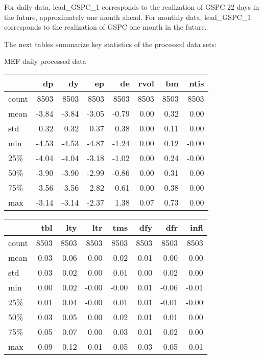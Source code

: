 \documentclass{article}
\begin{document}
For daily data, lead\_GSPC\_1 corresponds to the realization of GSPC 22 days in the future, approximately one month ahead. For monthly data, lead\_GSPC\_1 corresponds to the realization of GSPC one month in the future.

The next tables summarize key statistics of the processed data sets:

\newpage

MEF daily processed data

\begin{tabular}{lrrrrrrr}
\toprule
{} &    dp &    dy &    ep &    de &  rvol &    bm &  ntis \\
\midrule
count &  8503 &  8503 &  8503 &  8503 &  8503 &  8503 &  8503 \\
mean  &    -3.84 &    -3.84 &    -3.05 &    -0.79 &     0.00 &     0.32 &     0.00 \\
std   &     0.32 &     0.32 &     0.37 &     0.38 &     0.00 &     0.11 &     0.00 \\
min   &    -4.53 &    -4.53 &    -4.87 &    -1.24 &     0.00 &     0.12 &    -0.00 \\
25\%   &    -4.04 &    -4.04 &    -3.18 &    -1.02 &     0.00 &     0.24 &    -0.00 \\
50\%   &    -3.90 &    -3.90 &    -2.99 &    -0.86 &     0.00 &     0.31 &     0.00 \\
75\%   &    -3.56 &    -3.56 &    -2.82 &    -0.61 &     0.00 &     0.38 &     0.00 \\
max   &    -3.14 &    -3.14 &    -2.37 &     1.38 &     0.07 &     0.73 &     0.00 \\
\bottomrule
\end{tabular}

\bigskip

\begin{tabular}{lrrrrrrr}
\toprule
{} &   tbl &   lty &   ltr &   tms &   dfy &   dfr &  infl \\
\midrule
count &  8503 &  8503 &  8503 &  8503 &  8503 &  8503 &  8503 \\
mean  &     0.03 &     0.06 &     0.00 &     0.02 &     0.01 &     0.00 &     0.00 \\
std   &     0.03 &     0.02 &     0.00 &     0.01 &     0.00 &     0.02 &     0.00 \\
min   &     0.00 &     0.02 &    -0.00 &    -0.00 &     0.01 &    -0.06 &    -0.01 \\
25\%   &     0.01 &     0.04 &    -0.00 &     0.01 &     0.01 &    -0.01 &    -0.00 \\
50\%   &     0.03 &     0.05 &     0.00 &     0.02 &     0.01 &     0.01 &     0.00 \\
75\%   &     0.05 &     0.07 &     0.00 &     0.03 &     0.01 &     0.02 &     0.00 \\
max   &     0.09 &     0.12 &     0.01 &     0.05 &     0.03 &     0.05 &     0.01 \\
\bottomrule
\end{tabular}
\end{document}
